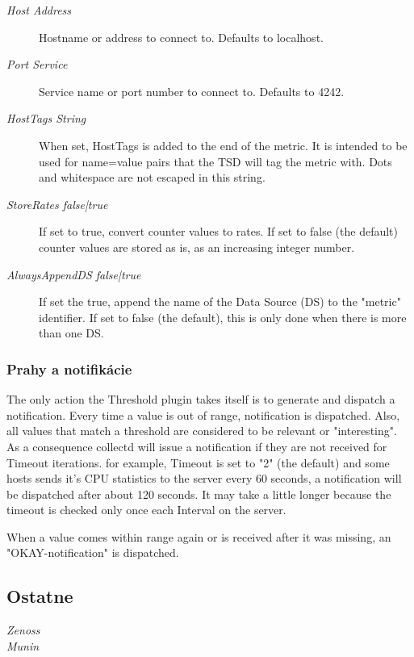 \documentclass[11pt,final,oneside]{fithesis}
\begin{document}
\begin{description}
\item[\emph{Host Address}] Hostname or address to connect to. Defaults to localhost.
\item[\emph{Port Service}] Service name or port number to connect to. Defaults to 4242.
\item[\emph{HostTags String}] When set, HostTags is added to the end of the metric. It is intended to be used for name=value pairs that the TSD will tag the metric with. Dots and whitespace are not escaped in this string.
\item[\emph{StoreRates false|true}] If set to true, convert counter values to rates. If set to false (the default) counter values are stored as is, as an increasing integer number.
\item[\emph{AlwaysAppendDS false|true}] If set the true, append the name of the Data Source (DS) to the "metric" identifier. If set to false (the default), this is only done when there is more than one DS.
\end{description}

\subsubsection{Prahy a notifikácie}

The only action the Threshold plugin takes itself is to generate and dispatch a notification. Every time a value is out of range, 
notification is dispatched. 
Also, all values that match a threshold are considered to be relevant or "interesting". As a consequence collectd will issue a notification 
if they are not received for Timeout iterations.  for example, Timeout is set to "2" (the default) and some hosts sends it's CPU statistics to the server every 60 seconds, a notification will be dispatched after about 120 seconds. It may take a little longer because the timeout is checked only once each Interval on the server.

When a value comes within range again or is received after it was missing, an "OKAY-notification" is dispatched.
\cite{14}

\subsection{Ostatne} 
\begin{description}
\item[\emph{Zenoss}]
\item[\emph{Munin}]
\end{description}
\end{document}
